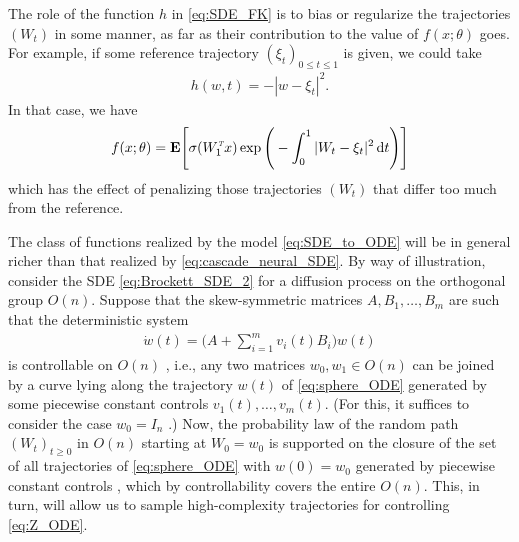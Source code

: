 \documentclass[letterpaper, 10pt, conference]{ieeeconf}
\def\Ex{{\mathbf E}} %
\def\trn{{\hbox{\it\tiny T}}} %
\begin{document}
The role of the function $h$ in \eqref{eq:SDE_FK} is to bias or regularize the trajectories $(W_t)$ in some manner, as far as their contribution to the value of $f(x;\theta)$ goes. For example, if some reference trajectory $(\xi_t)_{0 \le t \le 1}$ is given, we could take 
\begin{align*}
	h(w,t) = - |w - \xi_t|^2.
\end{align*}
In that case, we have
\begin{align*}
	f(x;\theta) = \Ex\Bigg[\sigma(W^\trn_1 x)\exp\Bigg(-\int^1_0 |W_t - \xi_t|^2\dif t \Bigg)\Bigg]
\end{align*}
which has the effect of penalizing those trajectories $(W_t)$ that differ too much from the reference.

The class of functions realized by the model \eqref{eq:SDE_to_ODE} will be in general richer than that realized by \eqref{eq:cascade_neural_SDE}. By way of illustration, consider the SDE \eqref{eq:Brockett_SDE_2} for a diffusion process on the orthogonal group $O(n)$. Suppose that the skew-symmetric matrices $A,B_1,\dots,B_m$ are such that the deterministic system
\begin{align}\label{eq:sphere_ODE}
	\dot{w}(t) = \Bigg(A + \sum^m_{i=1}v_i(t)B_i\Bigg) w(t)
\end{align}
is controllable on $O(n)$ \cite{Brockett_spheres}, i.e., any two matrices $w_0,w_1 \in O(n)$ can be joined by a curve lying along the trajectory $w(t)$ of \eqref{eq:sphere_ODE} generated by some piecewise constant controls $v_1(t),\dots,v_m(t)$. (For this, it suffices to consider the case $w_0 = I_n$ \cite{Jurdjevic_control_on_Lie_groups}.) Now, the probability law of the random path $(W_t)_{t \ge 0}$ in $O(n)$ starting at $W_0 = w_0$ is supported on the closure of the set of all trajectories of \eqref{eq:sphere_ODE} with $w(0) = w_0$ generated by piecewise constant controls \cite{Elliott_diffusions}, which by controllability covers the entire $O(n)$. This, in turn, will allow us to sample high-complexity trajectories for controlling \eqref{eq:Z_ODE}.
\end{document}
